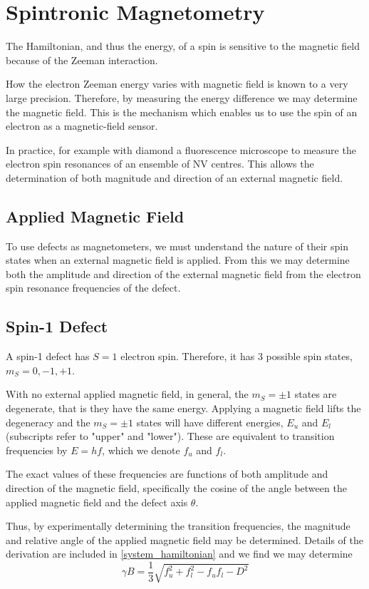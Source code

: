 \section{Spintronic Magnetometry}
The Hamiltonian, and thus the energy, of a spin is sensitive to the magnetic field because of the Zeeman interaction. 

How the electron Zeeman energy varies with magnetic field is known to a very large precision. 
Therefore, by measuring the energy difference we may determine the magnetic field. This is the mechanism which enables us to use the spin of an electron as a magnetic-field sensor. 

In practice, for example with diamond a fluorescence microscope to measure the electron spin resonances of an ensemble of NV centres. This allows the determination of both magnitude and direction of an external magnetic field. 


\subsection{Applied Magnetic Field}
To use defects as magnetometers, we must understand the nature of their spin states when an external magnetic field is applied. From this we may determine both the amplitude and direction of the external magnetic field from the electron spin resonance frequencies of the defect. 

\subsection{Spin-1 Defect}
A spin-1 defect has $S=1$ electron spin. Therefore, it has $3$ possible spin states, $m_S=0,−1,+1$. 

With no external applied magnetic field, in general, the $m_S  = \pm1$ states are degenerate, that is they have the same energy. Applying a magnetic field lifts the degeneracy and the $m_S=\pm1$ states will have different energies, $E_u$ and $E_l$ (subscripts refer to "upper" and "lower"). These are equivalent to transition frequencies by $E=hf$, which we denote $f_u$ and $f_l$.

The exact values of these frequencies are functions of both amplitude and direction of the magnetic field, specifically the cosine of the angle between the applied magnetic field and the defect axis $\theta$.

Thus, by experimentally determining the transition frequencies, the magnitude and relative angle of the applied magnetic field may be determined. Details of the derivation are included in \ref{system_hamiltonian} and we find we may determine 
\begin{equation}
\gamma B = \frac{1}{3} \sqrt{f_u^2 + f_l^2 - f_uf_l - D^2}
\end{equation}

